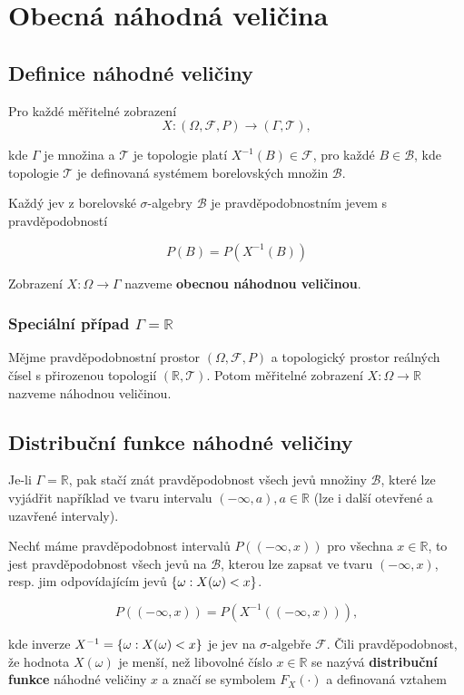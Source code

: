 	\section{Obecná náhodná veličina}
	\subsection{Definice náhodné veličiny}
	Pro každé měřitelné zobrazení
	\[ X: (\Omega,\mathscr{F},P)\to(\Gamma,\mathscr{T}), \]
	
	kde $\Gamma$ je množina a $\mathscr{T}$ je topologie platí $X^{-1}(B)\in\mathscr{F}$, pro každé $B\in\mathscr{B}$, kde topologie $\mathscr{T}$ je definovaná systémem borelovských množin $\mathscr{B}$.\br
	
	Každý jev z borelovské $\sigma$-algebry $\mathscr{B}$ je pravděpodobnostním jevem s pravděpodobností
	
	\[ P(B)=P(X^{-1}(B)) \]
	
	Zobrazení $X:\Omega\to\Gamma$ nazveme \textbf{obecnou náhodnou veličinou}.
	
	\subsubsection{Speciální případ $\Gamma=\mathbb{R}$}
	Mějme pravděpodobnostní prostor $(\Omega,\mathscr{F},P)$ a topologický prostor reálných čísel s přirozenou topologií $(\mathbb{R},\mathscr{T})$. Potom měřitelné zobrazení $X:\Omega\to\mathbb{R}$ nazveme náhodnou veličinou.
	
	\subsection{Distribuční funkce náhodné veličiny}
	Je-li $\Gamma=\mathbb{R}$, pak stačí znát pravděpodobnost všech jevů množiny $\mathscr{B}$, které lze vyjádřit například ve tvaru intervalu $(-\infty,a), a\in\mathbb{R}$ (lze i další otevřené a uzavřené intervaly).\br
	
	Nechť máme pravděpodobnost intervalů $P((-\infty,x))$ pro všechna $x\in\mathbb{R}$, to jest pravděpodobnost všech jevů na $\mathscr{B}$, kterou lze zapsat ve tvaru $(-\infty, x)$, resp. jim odpovídajícím jevů $\left\{\omega: X(\omega)<x\right\}$.
	
	\[ P((-\infty,x))=P(X^{-1}((-\infty,x))), \]
	
	kde inverze $X^{-1}=\left\{\omega: X(\omega)<x\right\}$ je jev na $\sigma$-algebře $\mathscr{F}$. Čili pravděpodobnost, že hodnota $X(\omega)$ je menší, než libovolné číslo $x\in\mathbb{R}$ se nazývá \textbf{distribuční funkce} náhodné veličiny $x$ a značí se symbolem $F_X(\cdot)$ a definovaná vztahem
	
